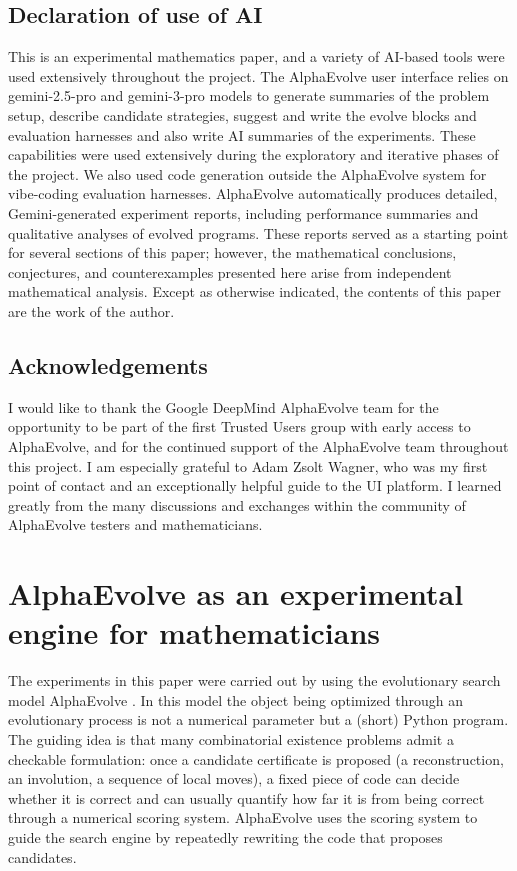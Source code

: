 \documentclass[11pt]{amsart}
\begin{document}
\subsection*{Declaration of use of AI}
This is an experimental mathematics paper, and a variety of AI-based tools were used extensively throughout the project. The AlphaEvolve user interface relies on gemini-2.5-pro and gemini-3-pro models to generate summaries of the problem setup, describe candidate strategies, suggest and write the evolve blocks and evaluation harnesses and also write AI summaries of the experiments. These capabilities were used extensively during the exploratory and iterative phases of the project. We also used code generation outside the AlphaEvolve system for vibe-coding evaluation harnesses. AlphaEvolve automatically produces detailed, Gemini-generated experiment reports, including performance summaries and qualitative analyses of evolved programs. These reports served as a starting point for several sections of this paper; however, the mathematical conclusions, conjectures, and counterexamples presented here arise from independent mathematical analysis. Except as otherwise indicated, the contents of this paper are the work of the author.


\subsection*{Acknowledgements}
I would like to thank the Google DeepMind AlphaEvolve team for the opportunity to be part of the first Trusted Users group with early access to AlphaEvolve, and for the continued support of the AlphaEvolve team throughout this project. 
I am especially grateful to Adam Zsolt Wagner, who was my first point of contact and an exceptionally helpful guide to the UI platform. I learned greatly from the many discussions and exchanges within the community of AlphaEvolve testers and mathematicians.



\section{AlphaEvolve as an experimental engine for mathematicians}
\label{sec:alphaevolve}

The experiments in this paper were carried out by using the evolutionary search model AlphaEvolve \cite{DeepMindAlphaEvolve2025,AlphaEvolveArxiv}. In this model the object being optimized through an evolutionary process  is not a numerical parameter but a (short) Python program.
The guiding idea is that many combinatorial existence problems admit a checkable formulation: once a candidate certificate is proposed (a reconstruction, an involution, a sequence of local moves), a fixed piece of code can decide whether it is correct and can usually quantify how far it is from being correct through a numerical scoring system.
AlphaEvolve uses the scoring system to guide the search engine by repeatedly rewriting the code that proposes candidates.
\end{document}
